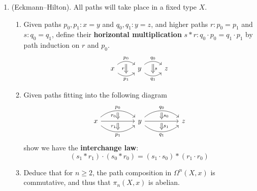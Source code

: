 \documentclass[10pt,oneside,leqno,openright]{memoir}
\begin{document}
\begin{enumerate}
    \item (Eckmann--Hilton). All paths will take place in a fixed type $X$.
    \begin{enumerate}
        \item Given paths $p_0, p_1 : x = y$ and $q_0, q_1: y = z$, and higher paths $r : p_0 = p_1$ and $s : q_0 = q_1$, define their \textbf{horizontal multiplication} $s \ast r : q_0 \cdot p_0 = q_1 \cdot p_1$ by path induction on $r$ and $p_0$.
        \[\begin{tikzcd}
    	x & y & z
    	\arrow[""{name=0, anchor=center, inner sep=0}, "{p_1}"', bend right=40, from=1-1, to=1-2]
    	\arrow[""{name=1, anchor=center, inner sep=0}, "{q_1}"', bend right=40, from=1-2, to=1-3]
    	\arrow[""{name=2, anchor=center, inner sep=0}, "p_0", bend left=40, from=1-1, to=1-2]
    	\arrow[""{name=3, anchor=center, inner sep=0}, "q_0", bend left=40, from=1-2, to=1-3]
    	\arrow["s", shorten <=3pt, shorten >=3pt, Rightarrow, from=3, to=1]
    	\arrow["r"', shorten <=3pt, shorten >=3pt, Rightarrow, from=2, to=0]
        \end{tikzcd}\]

        \item Given paths fitting into the following diagram
    	\[\begin{tikzcd}
        x && y && z
        \arrow[""{name=0, anchor=center, inner sep=0}, "{p_1}"', bend right=40, from=1-1, to=1-3]
    	\arrow[""{name=1, anchor=center, inner sep=0}, "{q_1}"', bend right=40, from=1-3, to=1-5]
    	\arrow[""{name=2, anchor=center, inner sep=0}, "{p_0}", bend left=40, from=1-1, to=1-3]
    	\arrow[""{name=3, anchor=center, inner sep=0}, "{q_0}", bend left=40, from=1-3, to=1-5]
    	\arrow[""{name=4, anchor=center, inner sep=0}, from=1-1, to=1-3]
    	\arrow[""{name=5, anchor=center, inner sep=0}, from=1-3, to=1-5]
    	\arrow["{r_0}"', shorten <=2pt, shorten >=2pt, Rightarrow, from=2, to=4]
    	\arrow["{r_1}"', shorten <=2pt, shorten >=2pt, Rightarrow, from=4, to=0]
    	\arrow["{s_0}", shorten <=2pt, shorten >=2pt, Rightarrow, from=3, to=5]
    	\arrow["{s_1}", shorten <=2pt, shorten >=2pt, Rightarrow, from=5, to=1]
        \end{tikzcd}\]
        show we have the \textbf{interchange law}:
        \[ (s_1 \ast r_1) \cdot (s_0 \ast r_0) = (s_1 \cdot s_0) \ast (r_1 \cdot r_0)  \]

        \item Deduce that for $n \geq 2$, the path composition in $\Omega^n(X, x)$ is commutative, and thus that $\pi_n(X, x)$ is abelian.
    \end{enumerate}


\end{enumerate}
\end{document}
